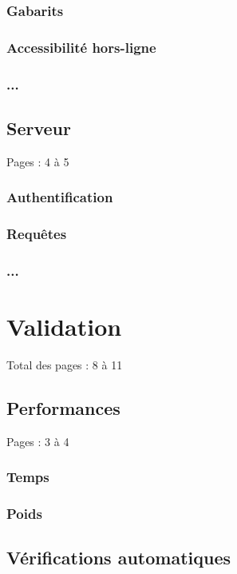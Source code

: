 \documentclass{eplmastersthesis_FR}
\begin{document}
			\subsection*{Gabarits}
			\subsection*{Accessibilité hors-ligne}
			\subsection*{...}

		\section{Serveur}

			Pages : 4 à 5
			\subsection*{Authentification}
			\subsection*{Requêtes}
			\subsection*{...}

	\chapter{Validation}

		Total des pages : 8 à 11

		\section{Performances}

			Pages : 3 à 4

			\subsection*{Temps}
			\subsection*{Poids}

		\section{Vérifications automatiques}
\end{document}
